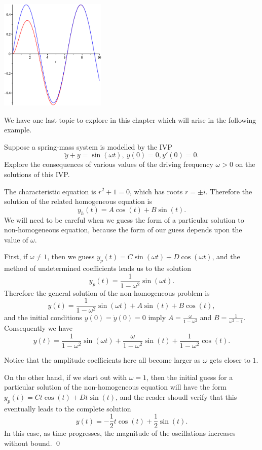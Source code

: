 \documentclass[12pt,letterpaper,twoside]{amsart}
\newcounter{example}
\newcounter{problem}
\newcommand{\example}{\bigskip \noindent {\large {\sc Example \arabic{example}:}} \addtocounter{example}{1}}
\begin{document}
\begin{center}
\includegraphics[width=2in]{steadystatecomparison.eps}
\end{center}

We have one last topic to explore in this chapter which will arise in the following example.

\example Suppose a spring-mass system is modelled by the IVP
\[ \ddot{y} + y = \sin(\omega t), \ y(0)=0, y'(0)=0.\]
Explore the consequences of various values of the driving frequency $\omega>0$ on the solutions of this IVP.

The characteristic equation is $r^2+1=0$, which has roots $r=\pm i$.  Therefore the solution of the related homogeneous equation is 
\[ y_h (t) = A \cos(t) + B \sin(t).\]
We will need to be careful when we guess the form of a particular solution to non-homogeneous equation, because the form of our guess depends upon the value of $\omega$.

First, if $\omega \neq 1$, then we guess $y_p(t)=C \sin(\omega t) + D \cos(\omega t)$, and the method of undetermined coefficients leads us to the solution
\[ y_p(t) = \frac{1}{1-\omega^2} \sin\left( \omega t \right). \]
Therefore the general solution of the non-homogeneous problem is
\[ y(t) = \frac{1}{1-\omega^2} \sin \left( \omega t \right) + A \sin(t) + B \cos(t),\]
and the initial conditions $y(0)=\dot{y}(0)=0$ imply $A=\frac{\omega}{1-\omega^2}$ and $B=\frac{1}{\omega^2-1}$.  Consequently we have
\[ y(t) = \frac{1}{1-\omega^2} \sin \left( \omega t \right) + \frac{\omega}{1-\omega^2} \sin(t) + \frac{1}{1-\omega^2} \cos(t).\]


Notice that the amplitude coefficients here all become larger as $\omega$ gets closer to $1$.

On the other hand, if we start out with $\omega = 1$, then the initial guess for a particular solution of the non-homogeneous equation will have the form $y_p(t) = C t \cos(t) + D t \sin(t)$, and the reader shoudl verify that this eventually leads to the complete solution
\[ y(t) = -\frac{1}{2} t \cos (t) + \frac{1}{2} \sin(t).\]
In this case, as time progresses, the magnitude of the oscillations increases without bound.
\qed
\end{document}
